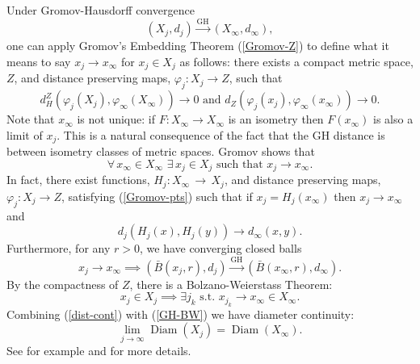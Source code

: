 \documentclass[12pt]{amsart}
\begin{document}
Under Gromov-Hausdorff convergence 
\begin{equation}
(X_j, d_j) {\stackrel { \textrm{GH}}{\longrightarrow} } (X_\infty, d_\infty),
\end{equation}
one can apply Gromov's Embedding Theorem (\ref{Gromov-Z}) to define
what it means to say $x_j \to x_\infty$ for $x_j \in X_j$ 
as follows: there exists
a compact metric space, $Z$, and distance preserving maps, $\varphi_j: X_j \to Z$, such that
\begin{equation} \label{Gromov-pts}
d_H^Z(\varphi_j(X_j), \varphi_\infty(X_\infty)) \to 0
\textrm{ and } d_Z(\varphi_j(x_j), \varphi_\infty(x_\infty))\to 0. 
\end{equation}
Note that $x_\infty$ is not unique: if $F: X_\infty\to X_\infty$ is an
isometry then $F(x_\infty)$ is also a limit of $x_j$.  This is a natural consequence
of the fact that the GH distance is between isometry classes of metric
spaces.  Gromov shows that 
\begin{equation} 
\forall \, x_\infty\in X_\infty \,\,\exists \,
x_j \in X_j \textrm{ such that } x_j \to x_\infty.
\end{equation}
In fact, there exist functions, $H_j: X_\infty \,\to\, X_j$, and distance
preserving maps, $\varphi_j: X_j \to Z$, satisfying (\ref{Gromov-pts})
such that if $x_j=H_j(x_\infty)$ then $x_j \to x_\infty$ 
and
\begin{equation} \label{dist-cont}
d_j(H_j(x), H_j(y)) \to d_\infty(x,y).
\end{equation}
Furthermore, for any $r>0$, we have converging closed balls
\begin{equation}  
x_j \to x_\infty \implies \left(\bar{B}(x_j, r), d_j\right) 
{\stackrel { \textrm{GH}}{\longrightarrow} } \left(\bar{B}(x_\infty, r), d_\infty\right).
\end{equation}
By the compactness
of $Z$, there is a Bolzano-Weierstass Theorem: 
\begin{equation} \label{GH-BW}
x_j \in X_j \implies \exists j_k \textrm{ s.t. } x_{j_k}\to x_\infty \in X_\infty.
\end{equation}
Combining (\ref{dist-cont}) with (\ref{GH-BW}) we have
diameter continuity:
\begin{equation}
\lim_{j\to\infty} {\operatorname{Diam}}(X_j)={\operatorname{Diam}}(X_\infty).
\end{equation}
See for example \cite{BBI} and \cite{Sormani-AA} for more details.
\end{document}
